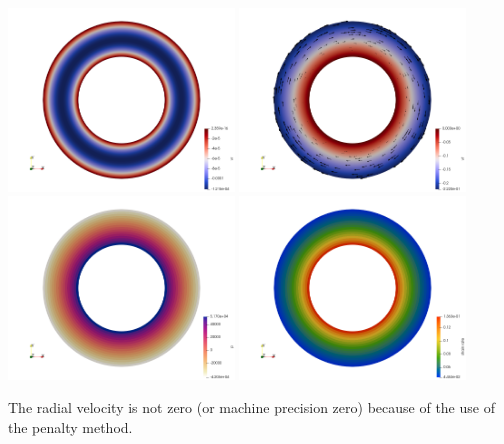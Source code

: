 \begin{center}
\includegraphics[width=6cm]{python_codes/fieldstone_33/results_test1/vr}
\includegraphics[width=6cm]{python_codes/fieldstone_33/results_test1/vt}\\
\includegraphics[width=6cm]{python_codes/fieldstone_33/results_test1/p}
\includegraphics[width=6cm]{python_codes/fieldstone_33/results_test1/sr}
\end{center}

The radial velocity is not zero (or machine precision zero) because of the use of the 
penalty method. 

